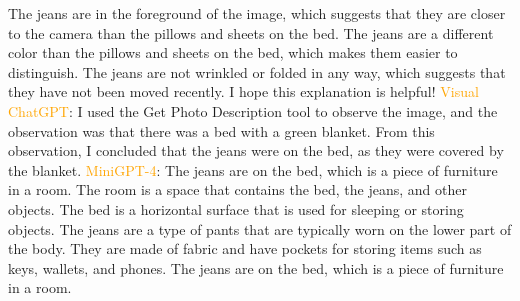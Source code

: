 \begin{enumerate}
    The jeans are in the foreground of the image, which suggests that they are closer to the camera than the pillows and sheets on the bed.
    The jeans are a different color than the pillows and sheets on the bed, which makes them easier to distinguish.
    The jeans are not wrinkled or folded in any way, which suggests that they have not been moved recently.
    I hope this explanation is helpful!
    \subitem \textcolor{orange}{Visual ChatGPT}: I used the Get Photo Description tool to observe the image, and the observation was that there was a bed with a green blanket. From this observation, I concluded that the jeans were on the bed, as they were covered by the blanket.
    \subitem \textcolor{orange}{MiniGPT-4}: The jeans are on the bed, which is a piece of furniture in a room. The room is a space that contains the bed, the jeans, and other objects. The bed is a horizontal surface that is used for sleeping or storing objects. The jeans are a type of pants that are typically worn on the lower part of the body. They are made of fabric and have pockets for storing items such as keys, wallets, and phones. The jeans are on the bed, which is a piece of furniture in a room.
\end{enumerate}

